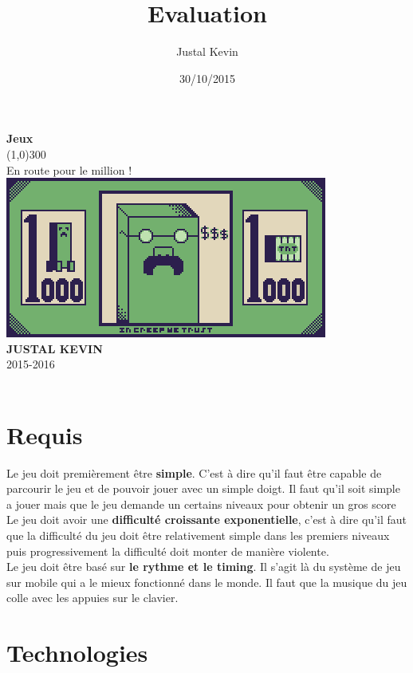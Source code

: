 \documentclass{article}
\title{Evaluation}
\author{Justal Kevin}
\date{30/10/2015}
\begin{document}
\begin{center}
\textbf{\Huge{Jeux}}\\
\line(1,0){300}\\
En route pour le million !\\
\vspace{3cm}
\includegraphics[width=\textwidth]{1}\\
\vspace{3cm}
\textbf{JUSTAL KEVIN}\\
2015-2016\\
\vspace{3cm}
\textbf{}\\
\end{center}

\newpage
\section{Requis}
Le jeu doit premièrement être \textbf{simple}. C'est à dire qu'il faut être capable de parcourir le jeu et de pouvoir jouer avec un simple doigt. Il faut qu'il soit simple a jouer mais que le jeu demande un certains niveaux pour obtenir un gros score\\

Le jeu doit avoir une \textbf{difficulté croissante exponentielle}, c'est à dire qu'il faut que la difficulté du jeu doit être relativement simple dans les premiers niveaux puis progressivement la difficulté doit monter de manière violente.\\

Le jeu doit être basé sur \textbf{le rythme et le timing}. Il s'agit là du système de jeu sur mobile qui a le mieux fonctionné dans le monde. Il faut que la musique du jeu colle avec les appuies sur le clavier.\\
\section{Technologies}
\end{document}
